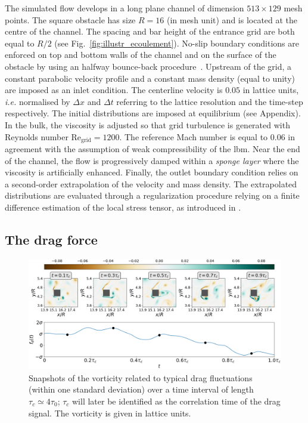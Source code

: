 \documentclass{jfm}
\begin{document}
%
The simulated flow develops in a long plane channel of dimension $513 \times 129$ mesh points. The square obstacle has size $R=16$ (in mesh unit) and is located at the centre of the channel. The spacing and bar height of the entrance grid are both equal to $R/2$ (see Fig.~\ref{fig:illustr_ecoulement}). 
%
No-slip boundary conditions are enforced on top and bottom walls of the channel and on the surface of the obstacle by using an halfway bounce-back procedure~\citep{lbm_book}.  
%
Upstream of the grid, a constant parabolic velocity profile and a constant mass density (equal to unity) are imposed as an inlet condition. 
The centerline velocity is $0.05$ in lattice units, \textit{i.e.} normalised by $\Delta x$ and $\Delta t$ referring to the lattice resolution and the time-step respectively. The initial distributions are imposed at equilibrium (see Appendix). 
In the bulk, the viscosity is adjusted so that grid turbulence is generated with Reynolds number $\mathrm{Re_{grid}}=1200$. The reference Mach number is equal to $0.06$ in agreement with the assumption of weak compressibility of the \ac{lbm}. 
Near the end of the channel, the flow is progressively damped within a \textit{sponge layer} where the viscosity is artificially enhanced.
Finally, the outlet boundary condition relies on a second-order extrapolation of the velocity and mass density.
The extrapolated distributions are evaluated through a regularization procedure relying on a finite difference estimation of the local stress tensor, as introduced in \citep{latt2008straight}. 

	
\subsection{The drag force}
\label{sec:drag_force}
	
\begin{figure}
	\centering
	\includegraphics[width=\linewidth]{ecoulement_typique/ecoulement_typique.png}
	\caption{Snapshots of the vorticity related to typical drag fluctuations (within one standard deviation) over a time interval of length $\tau_c \simeq 4\tau_0$; $\tau_c$ will later be identified as the correlation time of the drag signal.
	The vorticity is given in lattice units.}
	\label{fig:typical_vorticity}
\end{figure}
\end{document}

